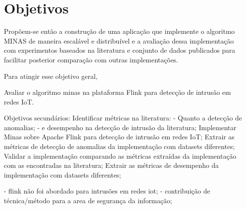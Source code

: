 \section{Objetivos}

% 

Propõem-se então a construção de uma aplicação que implemente o algoritmo MINAS
de maneira escalável e distribuível e a avaliação dessa implementação com
experimentos baseados na literatura e conjunto de dados publicados para
facilitar posterior comparação com outras implementações.

Para atingir esse objetivo geral, 

Avaliar o algoritmo minas na plataforma Flink para detecção de intrusão em redes IoT.


Objetivos secundários:
Identificar métricas na literatura:
    - Quanto a detecção de anomalias;
    - e desempenho na detecção de intrusão da literatura;
Implementar Minas sobre Apache Flink para detecção de intrusão em redes IoT;
Extrair as métricas de detecção de anomalias da implementação com datasets diferentes;
Validar a implementação comparando as métricas extraídas da implementação com as encontradas na literatura;
Extrair as métricas de desempenho da implementação com datasets diferentes;

- flink não foi abordado para intrusões em redes iot;
- contribuição de técnica/método para a area de segurança da informação;


